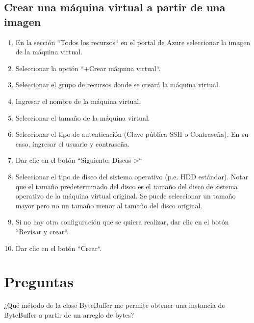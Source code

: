 \documentclass[11pt,a4paper,oneside]{book}
\begin{document}
\section{Crear una máquina virtual a partir de una imagen}

\begin{enumerate}

\item En la sección ``Todos los recursos`` en el portal de Azure seleccionar la imagen de la máquina virtual.

\item Seleccionar la opción ``+Crear máquina virtual``.

\item Seleccionar el grupo de recursos donde se creará la máquina virtual.

\item Ingresar el nombre de la máquina virtual.

\item Seleccionar el tamaño de la máquina virtual.

\item Seleccionar el tipo de autenticación (Clave pública SSH o Contraseña). En su caso, ingresar el usuario y contraseña.

\item Dar clic en el botón ``Siguiente: Discos >``

\item Seleccionar el tipo de disco del sistema operativo (p.e. HDD estándar). Notar que el tamaño predeterminado del disco es el tamaño del disco de sistema operativo de la máquina virtual original. Se puede seleccionar un tamaño mayor pero no un tamaño menor al tamaño del disco original.

\item Si no hay otra configuración que se quiera realizar, dar clic en el botón ``Revisar y crear``.

\item Dar clic en el botón ``Crear``.

\end{enumerate}

\chapter{Preguntas}

\begin{SourceCode}
¿Qué método de la clase ByteBuffer me permite obtener una instancia de ByteBuffer a partir de un arreglo de bytes?
\end{SourceCode}
\end{document}
